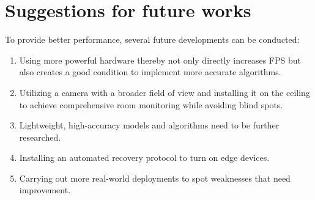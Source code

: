 \documentclass[../main.tex]{subfiles}
\begin{document}
\section{Suggestions for future works}
To provide better performance, several future developments can be conducted:

\begin{enumerate}
\item Using more powerful hardware thereby not only directly increases FPS but also creates a good condition to implement more accurate algorithms.
\item Utilizing a camera with a broader field of view and installing it on the ceiling to achieve comprehensive room monitoring while avoiding blind spots.
\item Lightweight, high-accuracy models and algorithms need to be further researched.
\item Installing an automated recovery protocol to turn on edge devices.
\item Carrying out more real-world deployments to spot weaknesses that need improvement.
\end{enumerate}
\end{document}
